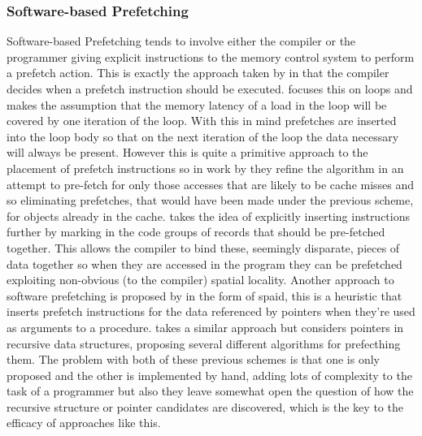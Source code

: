 \subsubsection{Software-based Prefetching}

Software-based Prefetching tends to involve either the compiler or the programmer giving explicit instructions to the memory control system to perform a prefetch action. This is exactly the approach taken by \citet{callahanSoftwarePrefetching1991} in that the compiler decides when a prefetch instruction should be executed. \citeauthor{callahanSoftwarePrefetching1991} focuses this on loops and makes the assumption that the memory latency of a load in the loop will be covered by one iteration of the loop. With this in mind prefetches are inserted into the loop body so that on the next iteration of the loop the data necessary will always be present. However this is quite a primitive approach to the placement of prefetch instructions so in work by \citet{mowryDesignEvaluationCompiler1992} they refine the algorithm in an attempt to pre-fetch for only those accesses that are likely to be cache misses and so eliminating prefetches, that would have been made under the previous scheme, for objects already in the cache.  \citet{zhangSpeedingIrregularApplications1995} takes the idea of explicitly inserting instructions further by marking in the code groups of records that should be pre-fetched together. This allows the compiler to bind these, seemingly disparate, pieces of data together so when they are accessed in the program they can be prefetched exploiting non-obvious (to the compiler) spatial locality. Another approach to software prefetching is proposed by \citet{lipastiSPAIDSoftwarePrefetching1995} in the form of \gls{spaid}, this is a heuristic that inserts prefetch instructions for the data referenced by pointers when they're used as arguments to a procedure. \citet{lukCompilerbasedPrefetchingRecursive1996} takes a similar approach but considers pointers in recursive data structures, proposing several different algorithms for prefecthing them. The problem with both of these previous schemes is that one is only proposed and the other is implemented by hand, adding lots of complexity to the task of a programmer but also they leave somewhat open the question of how the recursive structure or pointer candidates are discovered, which is the key to the efficacy of approaches like this.

